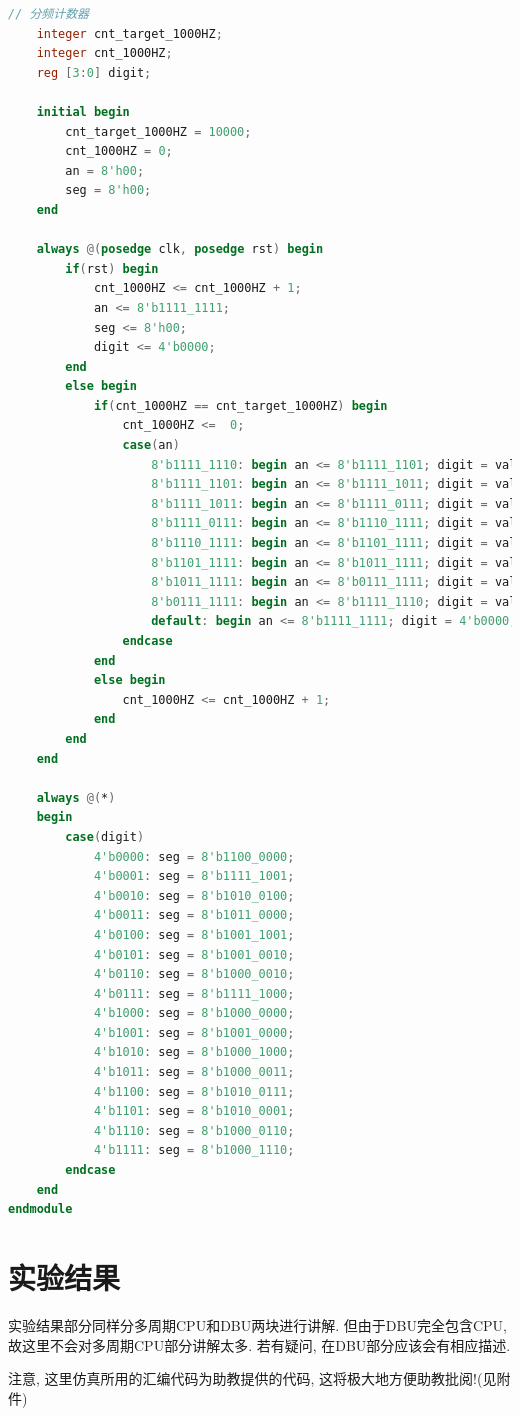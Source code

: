 \documentclass[UTF8]{article}
\begin{document}
\begin{enumerate}
\begin{lstlisting}[language=verilog]
    // 分频计数器
    integer cnt_target_1000HZ;
    integer cnt_1000HZ;
    reg [3:0] digit;
    
    initial begin
        cnt_target_1000HZ = 10000;
        cnt_1000HZ = 0;
        an = 8'h00;
        seg = 8'h00;
    end
    
    always @(posedge clk, posedge rst) begin
        if(rst) begin
            cnt_1000HZ <= cnt_1000HZ + 1;
            an <= 8'b1111_1111;
            seg <= 8'h00;
            digit <= 4'b0000;
        end
        else begin
            if(cnt_1000HZ == cnt_target_1000HZ) begin
                cnt_1000HZ <=  0;
                case(an)
                    8'b1111_1110: begin an <= 8'b1111_1101; digit = value[3:0]; end
                    8'b1111_1101: begin an <= 8'b1111_1011; digit = value[7:3]; end
                    8'b1111_1011: begin an <= 8'b1111_0111; digit = value[11:7]; end
                    8'b1111_0111: begin an <= 8'b1110_1111; digit = value[15:11]; end
                    8'b1110_1111: begin an <= 8'b1101_1111; digit = value[19:15]; end
                    8'b1101_1111: begin an <= 8'b1011_1111; digit = value[23:19]; end
                    8'b1011_1111: begin an <= 8'b0111_1111; digit = value[27:23]; end
                    8'b0111_1111: begin an <= 8'b1111_1110; digit = value[31:27]; end
                    default: begin an <= 8'b1111_1111; digit = 4'b0000; end
                endcase
            end
            else begin
                cnt_1000HZ <= cnt_1000HZ + 1;
            end
        end
    end
    
    always @(*)
    begin
        case(digit)
            4'b0000: seg = 8'b1100_0000;
            4'b0001: seg = 8'b1111_1001;
            4'b0010: seg = 8'b1010_0100;
            4'b0011: seg = 8'b1011_0000;
            4'b0100: seg = 8'b1001_1001;
            4'b0101: seg = 8'b1001_0010;
            4'b0110: seg = 8'b1000_0010;
            4'b0111: seg = 8'b1111_1000;
            4'b1000: seg = 8'b1000_0000;
            4'b1001: seg = 8'b1001_0000;
            4'b1010: seg = 8'b1000_1000;
            4'b1011: seg = 8'b1000_0011;
            4'b1100: seg = 8'b1010_0111;
            4'b1101: seg = 8'b1010_0001;
            4'b1110: seg = 8'b1000_0110;
            4'b1111: seg = 8'b1000_1110;
        endcase
    end
endmodule
	\end{lstlisting}
\end{enumerate}

\section{实验结果}
实验结果部分同样分多周期CPU和DBU两块进行讲解. 但由于DBU完全包含CPU, 故这里不会对多周期CPU部分讲解太多. 若有疑问, 在DBU部分应该会有相应描述.\par
注意, 这里仿真所用的汇编代码为助教提供的代码, 这将极大地方便助教批阅!(见附件)\par
\end{document}
